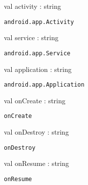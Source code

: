 \documentclass[11pt]{article}
\begin{document}
\begin{ocamldocsigend}


\label{val:Android.App.activity}\begin{ocamldoccode}
val activity : string
\end{ocamldoccode}
\begin{ocamldocdescription}
{\tt{android.app.Activity}}


\end{ocamldocdescription}


\label{val:Android.App.service}\begin{ocamldoccode}
val service : string
\end{ocamldoccode}
\begin{ocamldocdescription}
{\tt{android.app.Service}}


\end{ocamldocdescription}


\label{val:Android.App.application}\begin{ocamldoccode}
val application : string
\end{ocamldoccode}
\begin{ocamldocdescription}
{\tt{android.app.Application}}


\end{ocamldocdescription}


\label{val:Android.App.onCreate}\begin{ocamldoccode}
val onCreate : string
\end{ocamldoccode}
\begin{ocamldocdescription}
{\tt{onCreate}}


\end{ocamldocdescription}


\label{val:Android.App.onDestroy}\begin{ocamldoccode}
val onDestroy : string
\end{ocamldoccode}
\begin{ocamldocdescription}
{\tt{onDestroy}}


\end{ocamldocdescription}


\label{val:Android.App.onResume}\begin{ocamldoccode}
val onResume : string
\end{ocamldoccode}
\begin{ocamldocdescription}
{\tt{onResume}}



\end{ocamldocdescription}
\end{ocamldocsigend}
\end{document}
